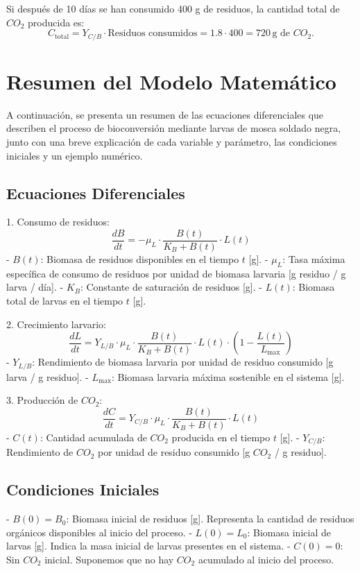 \documentclass[12pt]{article}
\begin{document}
Si después de 10 días se han consumido 400 g de residuos, la cantidad total de $CO_2$ producida es:
\begin{equation}
    C_{\text{total}} = Y_{C/B} \cdot \text{Residuos consumidos} = 1.8 \cdot 400 = 720 \, \text{g de } CO_2.
\end{equation}
\section{Resumen del Modelo Matemático}

A continuación, se presenta un resumen de las ecuaciones diferenciales que describen el proceso de bioconversión mediante larvas de mosca soldado negra, junto con una breve explicación de cada variable y parámetro, las condiciones iniciales y un ejemplo numérico.

\subsection{Ecuaciones Diferenciales}

1. Consumo de residuos:
   \[
   \frac{dB}{dt} = -\mu_L \cdot \frac{B(t)}{K_B + B(t)} \cdot L(t)
   \]
   - $B(t)$: Biomasa de residuos disponibles en el tiempo $t$ [g].
   - $\mu_L$: Tasa máxima específica de consumo de residuos por unidad de biomasa larvaria [g residuo / g larva / día].
   - $K_B$: Constante de saturación de residuos [g].
   - $L(t)$: Biomasa total de larvas en el tiempo $t$ [g].

2. Crecimiento larvario:
   \[
   \frac{dL}{dt} = Y_{L/B} \cdot \mu_L \cdot \frac{B(t)}{K_B + B(t)} \cdot L(t) \cdot \left(1 - \frac{L(t)}{L_{\text{max}}}\right)
   \]
   - $Y_{L/B}$: Rendimiento de biomasa larvaria por unidad de residuo consumido [g larva / g residuo].
   - $L_{\text{max}}$: Biomasa larvaria máxima sostenible en el sistema [g].

3. Producción de $CO_2$:
   \[
   \frac{dC}{dt} = Y_{C/B} \cdot \mu_L \cdot \frac{B(t)}{K_B + B(t)} \cdot L(t)
   \]
   - $C(t)$: Cantidad acumulada de $CO_2$ producida en el tiempo $t$ [g].
   - $Y_{C/B}$: Rendimiento de $CO_2$ por unidad de residuo consumido [g $CO_2$ / g residuo].

\subsection{Condiciones Iniciales}

- $B(0) = B_0$: Biomasa inicial de residuos [g]. Representa la cantidad de residuos orgánicos disponibles al inicio del proceso.
- $L(0) = L_0$: Biomasa inicial de larvas [g]. Indica la masa inicial de larvas presentes en el sistema.
- $C(0) = 0$: Sin $CO_2$ inicial. Suponemos que no hay $CO_2$ acumulado al inicio del proceso.
\end{document}
